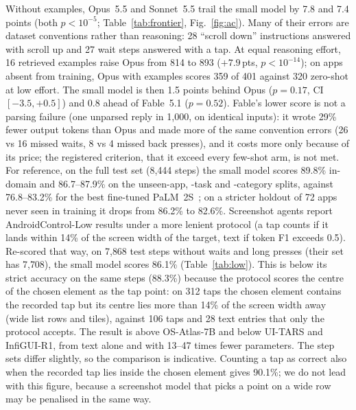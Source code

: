 \documentclass[10pt]{article}
\newcommand{\pts}{\,pts}
\begin{document}
Without examples, Opus~5.5 and Sonnet~5.5 trail the small model by 7.8 and 7.4 points (both $p<10^{-5}$; Table~\ref{tab:frontier}, Fig.~\ref{fig:ac}). Many of their errors are dataset conventions rather than reasoning: 28 ``scroll down'' instructions answered with scroll up and 27 wait steps answered with a tap. At equal reasoning effort, 16 retrieved examples raise Opus from 814 to 893 ($+7.9$\pts, $p<10^{-14}$); on apps absent from training, Opus with examples scores 359 of 401 against 320 zero-shot at low effort. The small model is then 1.5 points behind Opus ($p=0.17$, CI $[-3.5, +0.5]$) and 0.8 ahead of Fable~5.1 ($p=0.52$). Fable's lower score is not a parsing failure (one unparsed reply in 1{,}000, on identical inputs): it wrote 29\% fewer output tokens than Opus and made more of the same convention errors (26 vs 16 missed waits, 8 vs 4 missed back presses), and it costs more only because of its price; the registered criterion, that it exceed every few-shot arm, is not met. For reference, on the full test set (8{,}444 steps) the small model scores 89.8\% in-domain and 86.7--87.9\% on the unseen-app, -task and -category splits, against 76.8--83.2\% for the best fine-tuned PaLM~2S~\citep{androidcontrol}; on a stricter holdout of 72 apps never seen in training it drops from 86.2\% to 82.6\%. Screenshot agents report AndroidControl-Low results under a more lenient protocol (a tap counts if it lands within 14\% of the screen width of the target, text if token F1 exceeds 0.5). Re-scored that way, on 7{,}868 test steps without waits and long presses (their set has 7{,}708), the small model scores 86.1\% (Table~\ref{tab:low}). This is below its strict accuracy on the same steps (88.3\%) because the protocol scores the centre of the chosen element as the tap point: on 312 taps the chosen element contains the recorded tap but its centre lies more than 14\% of the screen width away (wide list rows and tiles), against 106 taps and 28 text entries that only the protocol accepts. The result is above OS-Atlas-7B and below UI-TARS and InfiGUI-R1, from text alone and with 13--47 times fewer parameters. The step sets differ slightly, so the comparison is indicative. Counting a tap as correct also when the recorded tap lies inside the chosen element gives 90.1\%; we do not lead with this figure, because a screenshot model that picks a point on a wide row may be penalised in the same way.
\end{document}
